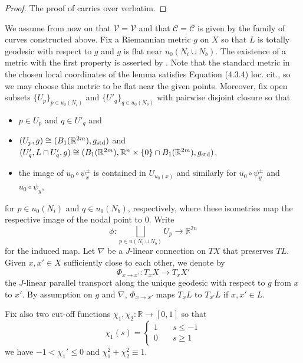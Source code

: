 \documentclass[11pt,psamsfonts, oneside, reqno]{amsart}
\newcommand{\g}{\circ}%
\newcommand{\cl}{\colon}
\newcommand{\djun}[1]{\bigsqcup\limits_{#1}}
\newcommand{\scC}{\mathscr{C}}
\newcommand{\scV}{\mathscr{V}}
\newcommand{\conn}{\nabla}
\newcommand{\bR}{\mathbb{R}}
\newcommand{\cC}{\mathcal{C}}
\newcommand{\cV}{\mathcal{V}}
\theoremstyle{definition}
\theoremstyle{remark}
\numberwithin{equation}{section}
\begin{document}
\begin{proof} The proof of \cite[Lemma~4.1]{Swa21} carries over verbatim.
\end{proof}

\noindent
We assume from now on that $\cV= \scV$ and that $\cC = \scC$ is given by the family of curves constructed above. 
 Fix a Riemannian metric $g$ on $X$ so that $L$ is totally geodesic with respect to $g$ and $g$ is flat near $u_0(N_i \cup N_b)$. The existence of a metric with the first property is asserted by \cite[Lemma~4.3.4]{MS12}. Note that the standard metric in the chosen local coordinates of the lemma satisfies Equation (4.3.4) loc. cit., so we may choose this metric to be flat near the given points. Moreover, fix open subsets $\{U_p\}_{p\in u_0(N_i)}$ and $\{U'_q\}_{q\in u_0(N_b)}$ with pairwise disjoint closure so that 
 \begin{itemize}
 	\item $p\in U_p$ and $q\in U'_q$ and
 	\item $(U_p,g)\cong (B_1(\bR^{2m}),g_{\normalfont\text{std}})$ and $(U'_q,L\cap U'_q,g)\cong (B_1(\bR^{2m}),\bR^n\times\{0\}\cap B_1(\bR^{2m}),g_{\normalfont\text{std}})$,
 	\item the image of $u_0\g \psi_x^\pm$ is contained in $U_{u_0(x)}$ and similarly for $u_0\g \psi^\pm_y$ and $u_0\g \psi_y$,
 \end{itemize}
 for $p \in u_0(N_i)$ and $q\in u_0(N_b)$, respectively, where these isometries map the respective image of the nodal point to $0$. Write 
 \begin{equation*} \phi \cl \djun{p\in u(N_i\sqcup N_b)}U_p \to \bR^{2n}\end{equation*}
 for the induced map. Let $\conn$ be a $J$-linear connection on $TX$ that preserves $TL$. Given $x,x' \in X$ sufficiently close to each other, we denote by 
 \begin{equation*}\label{} \Phi_{x\to x'} \cl T_xX\to T_x X'\end{equation*} the $J$-linear parallel transport along the unique geodesic with respect to $g$ from $x$ to $x'$. By assumption on $g$ and $\conn$, $\Phi_{x\to x'}$ maps $T_xL$ to $T_{x'}L$ if $x,x'\in L$.\par
 
  Fix also two cut-off functions $\chi_1,\chi_2 \cl \bR\to [0,1]$ so that 
 \begin{equation*}\label{}\chi_1(s) = 
 	\begin{cases}
 		1 \quad & s \leq -1\\
 		0 \quad & s \geq 1
 \end{cases}\end{equation*}
we have $-1 < \chi_1' \leq 0$ and $\chi_1^2+ \chi_2^2 \equiv 1$.
\end{document}
